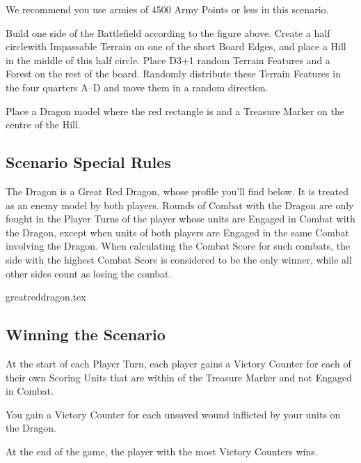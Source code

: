 We recommend you use armies of 4500 Army Points or less in this scenario.

Build one side of the Battlefield according to the figure above. Create a half circlewith Impassable Terrain on one of the short Board Edges, and place a Hill in the middle of this half circle. Place D3+1 random Terrain Features and a Forest on the rest of the board. Randomly distribute these Terrain Features in the four quarters A--D and move them  in a random direction. 

Place a Dragon model where the red rectangle is and a Treasure Marker on the centre of the Hill.

\subsection*{Scenario Special Rules}

The Dragon is a Great Red Dragon, whose profile you'll find below. It is treated as an enemy model by both players. Rounds of Combat with the Dragon are only fought in the Player Turns of the player whose units are Engaged in Combat with the Dragon, except when units of both players are Engaged in the same Combat involving the Dragon. When calculating the Combat Score for such combats, the side with the highest Combat Score is considered to be the only winner, while all other sides count as losing the combat.

{greatreddragon.tex}

\subsection*{Winning the Scenario}

At the start of each Player Turn, each player gains a Victory Counter for each of their own Scoring Units that are within  of the Treasure Marker and not Engaged in Combat.

You gain a Victory Counter for each unsaved wound inflicted by your units on the Dragon.

At the end of the game, the player with the most Victory Counters wins. 
